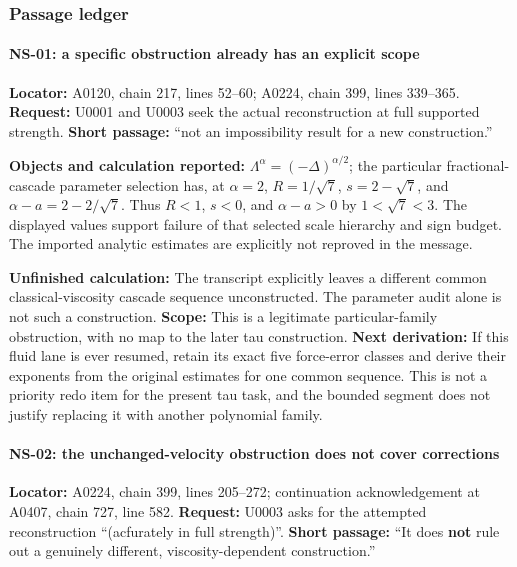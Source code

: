 \subsubsection{Passage ledger}\label{TranscriptLedgerStage:passage-ledger}

\paragraph{NS-01: a specific obstruction already has an explicit
scope}\label{TranscriptLedgerStage:ns-01-a-specific-obstruction-already-has-an-explicit-scope}

\textbf{Locator:} A0120, chain 217, lines 52--60; A0224, chain 399,
lines 339--365. \textbf{Request:} U0001 and U0003 seek the actual
reconstruction at full supported strength. \textbf{Short passage:} ``not
an impossibility result for a new construction.''

\textbf{Objects and calculation reported:}
\(\Lambda^\alpha=(-\Delta)^{\alpha/2}\); the particular
fractional-cascade parameter selection has, at \(\alpha=2\),
\(R=1/\sqrt7\), \(s=2-\sqrt7\), and \(\alpha-a=2-2/\sqrt7\). Thus
\(R<1\), \(s<0\), and \(\alpha-a>0\) by \(1<\sqrt7<3\). The displayed
values support failure of that selected scale hierarchy and sign budget.
The imported analytic estimates are explicitly not reproved in the
message.

\textbf{Unfinished calculation:} The transcript explicitly leaves a
different common classical-viscosity cascade sequence unconstructed. The
parameter audit alone is not such a construction. \textbf{Scope:} This
is a legitimate particular-family obstruction, with no map to the later
tau construction. \textbf{Next derivation:} If this fluid lane is ever
resumed, retain its exact five force-error classes and derive their
exponents from the original estimates for one common sequence. This is
not a priority redo item for the present tau task, and the bounded
segment does not justify replacing it with another polynomial family.

\paragraph{NS-02: the unchanged-velocity obstruction does not cover
corrections}\label{TranscriptLedgerStage:ns-02-the-unchanged-velocity-obstruction-does-not-cover-corrections}

\textbf{Locator:} A0224, chain 399, lines 205--272; continuation
acknowledgement at A0407, chain 727, line 582. \textbf{Request:} U0003
asks for the attempted reconstruction ``(acfurately in full strength)''.
\textbf{Short passage:} ``It does \textbf{not} rule out a genuinely
different, viscosity-dependent construction.''

